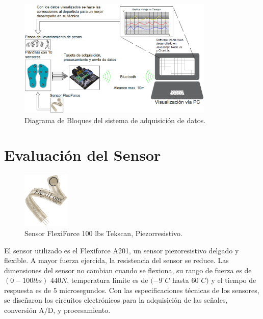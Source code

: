 

\begin{figure}[H]
\centering
\includegraphics[width=0.83\textwidth]{./image/Diagrama_de_Bloques_sistema_Insole.png}
\caption{Diagrama de Bloques del sistema de adquisición de datos.}
\label{fig:DiagramaBloque}
\end{figure}


\section{Evaluación del Sensor}

\begin{figure}
\centering
\includegraphics[width=0.2\textwidth]{./image/SensorFlexiForce.png}
\caption{Sensor FlexiForce 100 lbs Tekscan, Piezorresistivo.}
\label{fig:Sensor}
\end{figure}

El sensor utilizado es el Flexiforce A201, un sensor piezoresistivo delgado y flexible. A mayor fuerza ejercida, la resistencia del sensor se reduce. Las dimensiones del sensor no cambian cuando se flexiona, su rango de fuerza es de $(0-100lbs)$ $440N$, temperatura limite es de $(-9^\circ C$ hasta $60^\circ C)$ y el tiempo de respuesta es de $5$ microsegundos. Con las especificaciones técnicas de los sensores, se diseñaron los circuitos electrónicos para la adquisición de las señales, conversión A/D, y procesamiento.

